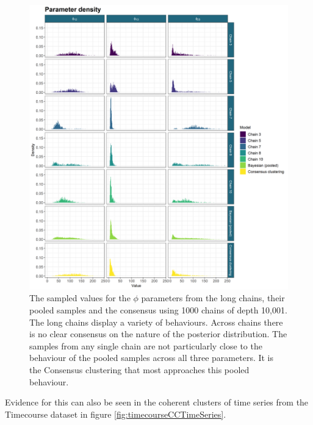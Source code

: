 \documentclass[]{article}
\begin{document}
\begin{figure}
	\centering
	\includegraphics[scale=0.6]{./Images/Yeast/ComparisonDensities.png}
	\caption{The sampled values for the $\phi$ parameters from the long chains, their pooled samples and the consensus using 1000 chains of depth 10,001. The long chains display a variety of behaviours. Across chains there is no clear consensus on the nature of the posterior distribution. The samples from any single chain are not particularly close to the behaviour of the pooled samples across all three parameters. It is the Consensus clustering that most approaches this pooled behaviour.}
	\label{fig:densityComparison}
\end{figure}

Evidence for this can also be seen in the coherent clusters of time series from the Timecourse dataset in figure \ref{fig:timecourseCCTimeSeries}.
\end{document}
